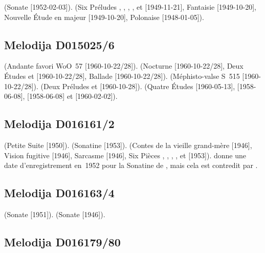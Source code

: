 \Beethoven{} (Sonate   [1952-02-03]).
\Chopin{} (Six Préludes  ,  ,
 ,  ,   et
  [1949-11-21], Fantaisie  [1949-10-20],
Nouvelle Étude en \kA \Flat majeur [1949-10-20], Polonaise 
[1948-01-05]).

\subsection{Melodija D015025/6}

\Beethoven{} (Andante favori WoO~57 [1960-10-22/28]).
\Chopin{} (Nocturne   [1960-10-22/28], Deux Études
  et   [1960-10-22/28], Ballade
 [1960-10-22/28]).
\Liszt{} (Méphisto-valse  S~515 [1960-10-22/28]).
\Rachmaninov{} (Deux Préludes   et  
[1960-10-28]).
\Scriabine{} (Quatre Études   [1960-05-13], 
 [1958-06-08],   [1958-06-08] et 
 [1960-02-02]).

\subsection{Melodija D016161/2}

\Borodine{} (Petite Suite [1950]).
\Kabalevski{} (Sonatine   [1953]).
\Prokofiev{} (Contes de la vieille grand-mère  [1946], Vision
fugitive   [1946], Sarcasme   [1946],
Six Pièces  ,  ,  ,
 ,   et   [1953]).
\INikonovich{} \citep[voir][p.~4]{Nikonovich11} donne une date
d'enregistrement en~1952 pour la Sonatine   de
\Kabalevski{}, mais cela est contredit par \FMalik{}
\citep[voir][p.~66]{Malik}.

\subsection{Melodija D016163/4}

\Beethoven{} (Sonate  [1951]).
\Scriabine{} (Sonate  [1946]).

\subsection{Melodija D016179/80}

